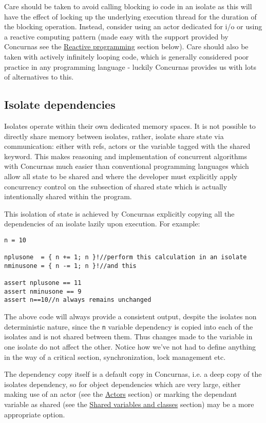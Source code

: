 \documentclass[conc-doc]{subfiles}
\begin{document}
Care should be taken to avoid calling blocking io code in an isolate as this will have the effect of locking up the underlying execution thread for the duration of the blocking operation. Instead, consider using an actor dedicated for i/o or using a reactive computing pattern (made easy with the support provided by Concurnas see the \hyperref[sec:reactive]{Reactive programming} section below). Care should also be taken with actively infinitely looping code, which is generally considered poor practice in any programming language - luckily Concurnas provides us with lots of alternatives to this.


\subsection{Isolate dependencies}
Isolates operate within their own dedicated memory spaces. It is not possible to directly share memory between isolates, rather, isolate share state via communication: either with refs, actors or the variable tagged with the shared keyword. This makes reasoning and implementation of concurrent algorithms with Concurnas much easier than conventional programming languages which allow all state to be shared and where the developer must explicitly apply concurrency control on the subsection of shared state which is actually intentionally shared within the program.

This isolation of state is achieved by Concurnas explicitly copying all the dependencies of an isolate lazily upon execution. For example:

\begin{lstlisting}
n = 10

nplusone  = { n += 1; n }!//perform this calculation in an isolate
nminusone = { n -= 1; n }!//and this

assert nplusone == 11
assert nminusone == 9
assert n==10//n always remains unchanged
\end{lstlisting}

The above code will always provide a consistent output, despite the isolates non deterministic nature, since the \lstinline{n} variable dependency is copied into each of the isolates and is not shared between them. Thus changes made to the variable in one isolate do not affect the other. Notice how we've not had to define anything in the way of a critical section, synchronization, lock management etc.

The dependency copy itself is a default copy in Concurnas, i.e. a deep copy of the isolates dependency, so for object dependencies which are very large, either making use of an actor (see the \hyperref[sec:actors]{Actors} section) or marking the dependant variable as shared (see the \hyperref[sec:shared]{Shared variables and classes} section) may be a more appropriate option.
\end{document}
